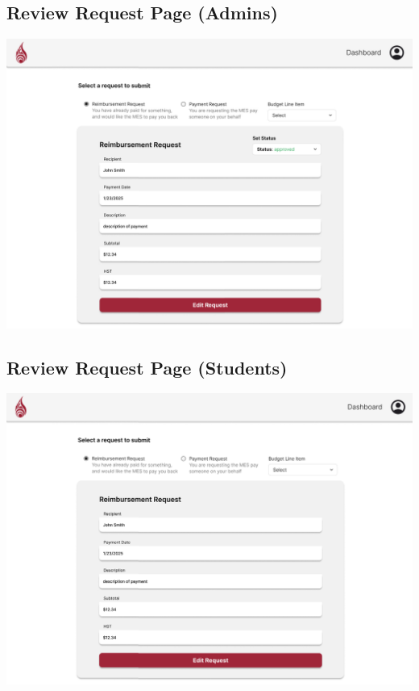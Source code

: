 \documentclass[12pt, titlepage]{article}
\begin{document}
\subsection{Review Request Page (Admins)}
\includegraphics[]{imgs/ReviewRequestAdmins.png}

\subsection{Review Request Page (Students)}
\includegraphics[]{imgs/ReviewRequestStudent.png}
\end{document}
